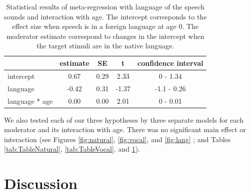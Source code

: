 \documentclass[
  english,
  man]{apa6}
\begin{document}
\begin{table}[tbp]

\begin{center}
\begin{threeparttable}

\caption{\label{tab:TableLang}Statistical results of meta-regression with language of the speech sounds and interaction with age. The intercept corresponds to the effect size when speech is in a foreign language at age 0. The moderator estimate correspond to changes in the intercept when the target stimuli are in the native language.}

\begin{tabular}{lcccc}
\toprule
 & estimate & SE & t & confidence interval\\
\midrule
intercept & 0.67 & 0.29 & 2.33 & 0 - 1.34\\
language & -0.42 & 0.31 & -1.37 & -1.1 - 0.26\\
language * age & 0.00 & 0.00 & 2.01 & 0 - 0.01\\
\bottomrule
\end{tabular}

\end{threeparttable}
\end{center}

\end{table}

We also tested each of our three hypotheses by three separate models for each moderator and its interaction with age. There was no significant main effect or interaction (see Figures \ref{fig:natural}, \ref{fig:vocal}, and \ref{fig:lang} ; and Tables \ref{tab:TableNatural}, \ref{tab:TableVocal}, and \ref{tab:TableLang}).

\hypertarget{discussion}{%
\section{Discussion}\label{discussion}}
\end{document}
